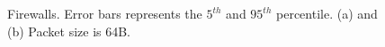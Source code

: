 \begin{figure}[t!]
	\centering
	\begin{minipage}{.6\textwidth}
		\centering
		\vspace{-10pt}
		\caption{Firewalls. Error bars represents the $5^{th}$ and $95^{th}$ percentile. (a) and (b) Packet size is 64B.}
		\vspace{-10pt}
		\label{fig:firewall}
	\end{minipage}
	\begin{minipage}{.3\textwidth}

\end{minipage}
\end{figure}
